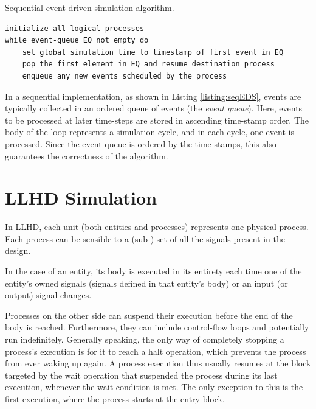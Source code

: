 \begin{listing}[ht]
    \caption{Sequential event-driven simulation algorithm.}
    \label{listing:seqEDS}
    \begin{verbatim}
initialize all logical processes
while event-queue EQ not empty do
    set global simulation time to timestamp of first event in EQ
    pop the first element in EQ and resume destination process
    enqueue any new events scheduled by the process
    \end{verbatim}
\end{listing}

In a sequential implementation, as shown in Listing \ref{listing:seqEDS}, events are typically collected in an ordered queue of events (the \textit{event queue}). Here, events to be processed at later time-steps are stored in ascending time-stamp order. The body of the loop represents a simulation cycle, and in each cycle, one event is processed. Since the event-queue is ordered by the time-stamps, this also guarantees the correctness of the algorithm.


\section{LLHD Simulation}
In LLHD, each unit (both entities and processes) represents one physical process. Each process can be sensible to a (sub-) set of all the signals present in the design.

In the case of an entity, its body is executed in its entirety each time one of the entity's owned signals (signals defined in that entity's body) or an input (or output) signal changes.

Processes on the other side can suspend their execution before the end of the body is reached. Furthermore, they can include control-flow loops and potentially run indefinitely. Generally speaking, the only way of completely stopping a process's execution is for it to reach a halt operation, which prevents the process from ever waking up again. A process execution thus usually resumes at the block targeted by the wait operation that suspended the process during its last execution, whenever the wait condition is met. The only exception to this is the first execution, where the process starts at the entry block.

